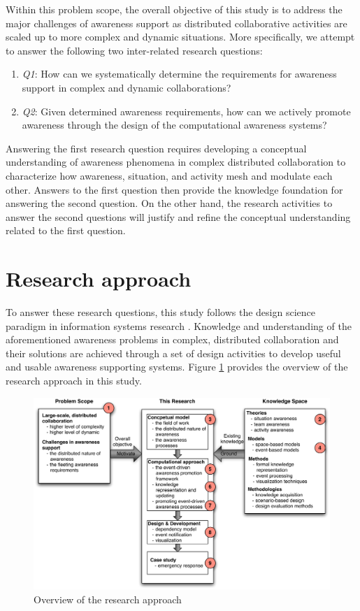 Within this problem scope, the overall objective of this study is to address the major challenges of awareness support as distributed collaborative activities are scaled up to more complex and dynamic situations. More specifically, we attempt to answer the following two inter-related research questions:

\begin{enumerate}
\item \emph{Q1}: How can we systematically determine the requirements for awareness support in complex and dynamic collaborations?

\item \emph{Q2}: Given determined awareness requirements, how can we actively promote awareness through the design of the computational awareness systems?
\end{enumerate}

Answering the first research question requires developing a conceptual understanding of awareness phenomena in complex distributed collaboration to characterize how awareness, situation, and activity mesh and modulate each other. Answers to the first question then provide the knowledge foundation for answering the second question. On the other hand, the research activities to answer the second questions will justify and refine the conceptual understanding related to the first question.

\section{Research approach} %
\label{sec:research_approach}
 To answer these research questions, this study follows the design science paradigm in information systems research \cite{Hevner2004}. Knowledge and understanding of the aforementioned awareness problems in complex, distributed collaboration and their solutions are achieved through a set of design activities to develop useful and usable awareness supporting systems. Figure \ref{fig:research_overview} provides the overview of the research approach in this study.

\begin{figure}[htbp] %
   \centering
   \includegraphics[width=5.8in]{research_overview.pdf} 
   \caption{Overview of the research approach}
   \label{fig:research_overview}
\end{figure}

